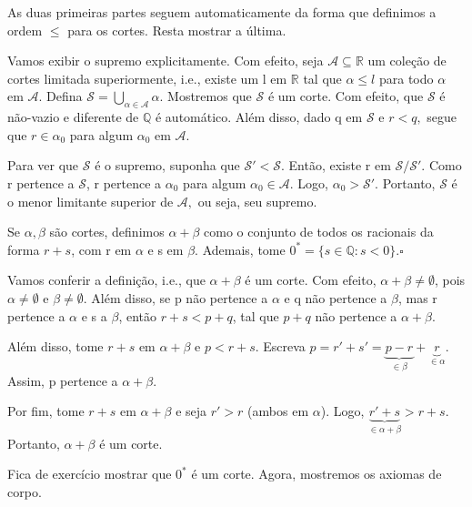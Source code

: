 \documentclass[analysis_notes.tex]{subfiles}
\begin{document}
\begin{proof*}
	As duas primeiras partes seguem automaticamente da forma que definimos a ordem $\leq{}$ para os cortes. Resta mostrar a \'ultima.

	Vamos exibir o supremo explicitamente. Com efeito, seja $\mathcal{A}\subseteq{\mathbb{R}}$ um cole\c c\~ao de cortes
	limitada superiormente, i.e., existe um l em $\mathbb{R}$ tal que $\alpha \leq{l}$ para todo $\alpha$ em $\mathcal{A}.$
	Defina $\mathcal{S} = \bigcup_{\alpha\in \mathcal{A}}\alpha$. Mostremos que $\mathcal{S}$ \'e um corte. Com efeito,
	que $\mathcal{S}$ \'e n\~ao-vazio e diferente de $\mathbb{Q}$ \'e autom\'atico. Al\'em disso, dado q em $\mathcal{S}$ e $r < q,$
	segue que $r\in \alpha_{0}$ para algum $\alpha_{0}$ em $\mathcal{A}.$

	Para ver que $\mathcal{S}$ \'e o supremo, suponha que $\mathcal{S}' < \mathcal{S}.$ Ent\~ao, existe r em $\mathcal{S}/\mathcal{S}'$.
	Como r pertence a $\mathcal{S}$, r pertence a $\alpha_{0}$ para algum $\alpha_{0}\in \mathcal{A}.$ Logo, $\alpha_{0} > \mathcal{S}'.$ Portanto,
	$\mathcal{S}$ \'e o menor limitante superior de $\mathcal{A},$ ou seja, seu supremo. \qedsymbol
\end{proof*}
\begin{def*}
	Se $\alpha, \beta$ s\~ao cortes, definimos $\alpha + \beta$ como o conjunto de todos os racionais da forma $r + s$, com r em $\alpha$
	e s em $\beta$. Ademais, tome $0^* = \{s\in \mathbb{Q}: s < 0\}.\square$
\end{def*}
Vamos conferir a defini\c c\~ao, i.e., que $\alpha + \beta$ \'e um corte. Com efeito, $\alpha + \beta\neq\emptyset$, pois $\alpha\neq\emptyset$
e $\beta\neq\emptyset$. Al\'em disso, se p n\~ao pertence a $\alpha$ e q n\~ao pertence a $\beta$, mas r pertence a $\alpha$ e s a $\beta$,
ent\~ao $r + s < p + q$, tal que $p + q$ n\~ao pertence a $\alpha + \beta.$

Al\'em disso, tome $r + s$ em $\alpha + \beta$ e $p < r + s$. Escreva $p = r' + s' = \underbrace{p - r}_{\in \beta} + \underbrace{r}_{\in \alpha}.$ Assim,
p pertence a $\alpha + \beta.$

Por fim, tome $r + s$ em $\alpha + \beta$ e seja $r' > r$ (ambos em $\alpha$). Logo, $\underbrace{r' + s}_{\in \alpha + \beta} > r + s$. Portanto,
$\alpha + \beta$ \'e um corte.

Fica de exerc\'icio mostrar que $0^*$ \'e um corte. Agora, mostremos os axiomas de corpo.
\end{document}
